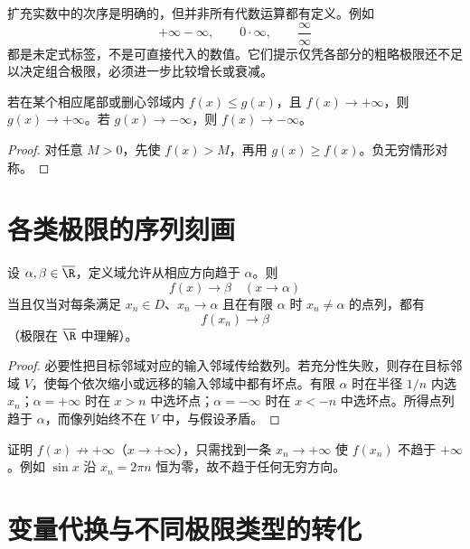 \begin{remark}[无穷运算的限制]
扩充实数中的次序是明确的，但并非所有代数运算都有定义。例如
\[
 +\infty-\infty,\qquad0\cdot\infty,\qquad\frac{\infty}{\infty}
\]
都是未定式标签，不是可直接代入的数值。它们提示仅凭各部分的粗略极限还不足以决定组合极限，必须进一步比较增长或衰减。
\end{remark}

\begin{proposition}[无穷极限的保序]
若在某个相应尾部或删心邻域内 \(f(x)\le g(x)\)，且 \(f(x)\to+\infty\)，则 \(g(x)\to+\infty\)。若 \(g(x)\to-\infty\)，则 \(f(x)\to-\infty\)。
\end{proposition}

\begin{proof}
对任意 \(M>0\)，先使 \(f(x)>M\)，再用 \(g(x)\ge f(x)\)。负无穷情形对称。
\end{proof}

\section{各类极限的序列刻画}

\begin{theorem}[扩展 Heine 定理]
设 \(\alpha,\beta\in\overline{\R}\)，定义域允许从相应方向趋于 \(\alpha\)。则
\[
 f(x)\to\beta\quad(x\to\alpha)
\]
当且仅当对每条满足 \(x_n\in D\)、\(x_n\to\alpha\) 且在有限 \(\alpha\) 时 \(x_n\ne\alpha\) 的点列，都有
\[
 f(x_n)\to\beta
\]
（极限在 \(\overline{\R}\) 中理解）。
\end{theorem}

\begin{proof}
必要性把目标邻域对应的输入邻域传给数列。若充分性失败，则存在目标邻域 \(V\)，使每个依次缩小或远移的输入邻域中都有坏点。有限 \(\alpha\) 时在半径 \(1/n\) 内选 \(x_n\)；\(\alpha=+\infty\) 时在 \(x>n\) 中选坏点；\(\alpha=-\infty\) 时在 \(x<-n\) 中选坏点。所得点列趋于 \(\alpha\)，而像列始终不在 \(V\) 中，与假设矛盾。
\end{proof}

\begin{example}
证明 \(f(x)\not\to+\infty\)（\(x\to+\infty\)），只需找到一条 \(x_n\to+\infty\) 使 \(f(x_n)\) 不趋于 \(+\infty\)。例如 \(\sin x\) 沿 \(x_n=2\pi n\) 恒为零，故不趋于任何无穷方向。
\end{example}

\section{变量代换与不同极限类型的转化}

